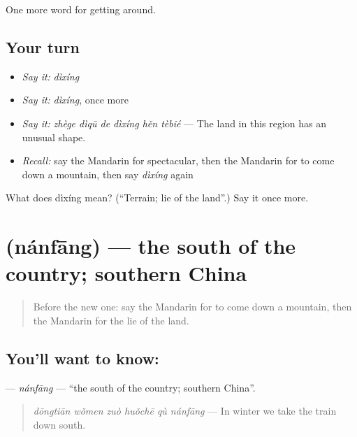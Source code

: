 \begin{grammarlens}[title={What you've built}]
One more word for getting around.
\end{grammarlens}

\subsection*{Your turn}
\begin{itemize}
\raggedright
  \item \emph{Say it:} \emph{dìxíng}
  \item \emph{Say it:} \emph{dìxíng}, once more
  \item \emph{Say it:} \emph{zhège dìqū de dìxíng hěn tèbié} — The land in this region has an unusual shape.
  \item \emph{Recall:} say the Mandarin for spectacular, then the Mandarin for to come down a mountain, then say \emph{dìxíng} again
\end{itemize}

\begin{tcolorbox}[breakable,colback=teal!4,colframe=teal!35!black,title={Before you move on}]
What does dìxíng mean? (\textquotedblleft{}Terrain; lie of the land\textquotedblright{}.) Say it once more.
\end{tcolorbox}
\section[\texorpdfstring{\zh{南方} (nánfāng)}{南方 (nánfāng)}]{ (nánfāng) — the south of the country; southern China}

\label{lesson:ZH-C436-nanfang}



\begin{quote}
Before the new one: say the Mandarin for to come down a mountain, then the Mandarin for the lie of the land.
\end{quote}

\subsection*{You'll want to know: }
\textbf{} — \emph{nánfāng} — \textquotedblleft{}the south of the country; southern China\textquotedblright{}.

\begin{quote}
\emph{dōngtiān wǒmen zuò huǒchē qù nánfāng} — In winter we take the train down south.
\end{quote}

